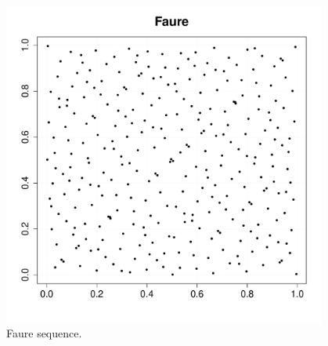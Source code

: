 {\begin{figure}[H]
\begin{minipage}{0.5\textwidth}
\begin{center}
              \includegraphics[width=0.95\textwidth]{Figures/faure_cloud.pdf}
              \caption{Faure sequence.}
              \label{Faure}
            \end{center}
          \end{minipage}
        \end{figure}

}
